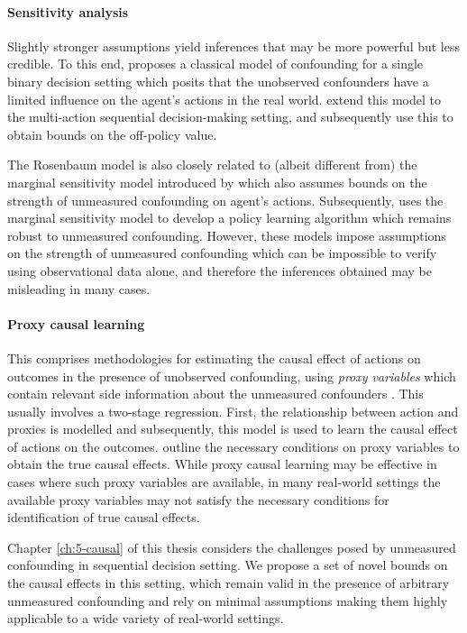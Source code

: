 \paragraph{Sensitivity analysis}
Slightly stronger assumptions yield inferences that may be more powerful but less credible. To this end, \cite{rosenbaum2002observational} proposes a classical model of confounding for a single binary decision setting which posits that the unobserved confounders have a limited influence on the agent's actions in the real world.  \cite{namkoong2020offpolicy} extend this model to the multi-action sequential decision-making setting, and subsequently use this to obtain bounds on the off-policy value.

The Rosenbaum model is also closely related to (albeit different from) the marginal sensitivity model introduced by \cite{tan2006distributional} which also assumes bounds on the strength of unmeasured confounding on agent's actions. Subsequently, \cite{kallus2020minimax} uses the marginal sensitivity model to develop a policy learning algorithm which remains robust to unmeasured confounding. However, these models impose assumptions on the strength of unmeasured confounding which can be impossible to verify using observational data alone, and therefore the inferences obtained may be misleading in many cases. 

\paragraph{Proxy causal learning}
This comprises methodologies for estimating the causal effect of actions on outcomes in the presence of unobserved confounding, using \emph{proxy variables} which contain relevant side information about the unmeasured confounders \citep{xu2021deep, tchetgen2020introduction, xu2024kernel}. This usually involves a two-stage regression. First, the relationship between action and proxies is modelled and subsequently, this model is used to learn the causal effect of actions on the outcomes. \cite{kuroki2014measurement} outline the necessary conditions on proxy variables to obtain the true causal effects. While proxy causal learning may be effective in cases where such proxy variables are available, in many real-world settings the available proxy variables may not satisfy the necessary conditions for identification of true causal effects.

Chapter \ref{ch:5-causal} of this thesis considers the challenges posed by unmeasured confounding in sequential decision setting. We propose a set of novel bounds on the causal effects in this setting, which remain valid in the presence of arbitrary unmeasured confounding and rely on minimal assumptions making them highly applicable to a wide variety of real-world settings. 


